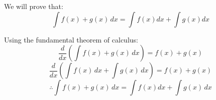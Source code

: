 We will prove that:
\[\int f(x) + g(x) \, dx = \int f(x) dx + \int g(x) dx\]

Using the fundamental theorem of calculus:
\[\frac{d}{dx} \left( \int f(x) + g(x) \, dx \right) = f(x) + g(x)\]
\[\frac{d}{dx} \left( \int f(x) \, dx + \int g(x) \, dx \right) = f(x) + g(x)\]
\[\therefore \int f(x) + g(x) \, dx = \int f(x) dx + \int g(x) \, dx\]
